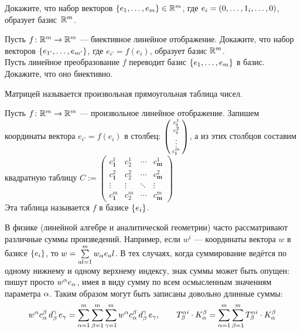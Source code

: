 \documentclass[a4paper,12pt]{article}
\begin{document}

    Докажите, что набор векторов $\left\{e_1,\ldots, e_m\right\}\in\mathbb{R}^m$, где $e_i=(0,\ldots,1_i,\ldots,0)$, образует базис~$\mathbb{R}^m$.

    Пусть $f\colon\mathbb{R}^m\rightarrow\mathbb{R}^m$ --- биективное линейное отображение. Докажите, что набор векторов $\left\{e_{1'},\ldots, e_{m'}\right\}$, где $e_{i'}=f(e_i)$, образует базис $\mathbb{R}^m$.\\
    Пусть линейное преобразование $f$ переводит базис $\left\{e_1,\ldots, e_m\right\}$ в базис. Докажите, что оно биективно.

     Матрицей называется произвольная прямоугольная таблица чисел.

    Пусть $f\colon\mathbb{R}^m\rightarrow\mathbb{R}^m$ --- произвольное линейное отображение.
    Запишем координаты вектора $e_{i'} = f(e_i)$ в столбец: $\left(\begin{smallmatrix}c^1_\textbf{i}\\c^2_\textbf{i}\\\vdots\\c^m_\textbf{i}\end{smallmatrix}\right)$, а из этих столбцов составим квадратную таблицу
    $C:=
    \begin{pmatrix}
    c^1_\textbf{1}&c^1_2&\cdots&c^1_\textbf{m}\\
    c^2_\textbf{1}&c^2_2&\cdots&c^2_\textbf{m}\\
    \vdots&\vdots&\ddots&\vdots\\
    c^m_\textbf{1}&c^m_2&\cdots&c^m_\textbf{m}
    \end{pmatrix}
    $
    \\
    Эта таблица называется  $f$ в базисе $\left\{e_i\right\}$.

В физике (линейной алгебре и аналитической геометрии) часто рассматривают различные суммы произведений.
Например, если $w^i$ --- координаты вектора $w$ в базисе $\left\{e_i\right\}$, то $w = \sum\limits_{al=1}^{m}w_\alpha e_al$.
В тех случаях, когда суммирование ведётся по одному нижнему и одному верхнему индексу, знак суммы может быть опущен:
пишут просто $w^\alpha e_\alpha$, имея в виду сумму по всем осмысленным значениям параметра $\alpha$.
Таким образом могут быть записаны довольно длинные суммы:
\vspace*{-4mm}
$$
w^\alpha c^\beta_\alpha\, d^\gamma_\beta\, e_\gamma = \sum_{\alpha=1}^{m}\sum_{\beta=1}^{m}\sum_{\gamma=1}^{m} w^\alpha c^\beta_\alpha\, d^\gamma_\beta\, e_\gamma,
\qquad
T^{\alpha i}_{\beta} \cdot K^{\beta}_{\alpha} = \sum_{\alpha=1}^{m}\sum_{\beta=1}^{m} T^{\alpha i}_{\beta} \cdot K^{\beta}_{\alpha}
$$
\vspace*{-4mm}
\end{document}
